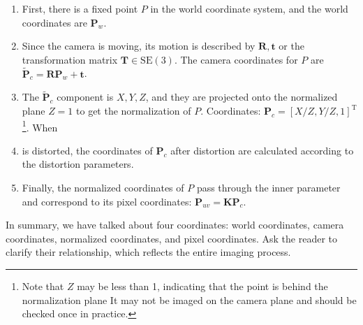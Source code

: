 \begin{enumerate}
	\item First, there is a fixed point $P$ in the world coordinate system, and the world coordinates are $\bm{P}_w$.
	\item Since the camera is moving, its motion is described by $\bm{R}, \bm{t}$ or the transformation matrix $\bm{T} \in \mathrm{SE}(3)$. The camera coordinates for $P$ are $\bm{\tilde{P}}_c = \bm{R} \bm{P}_w + \bm{t}$.
	\item The $\bm{\tilde{P}}_c$ component is $X,Y,Z$, and they are projected onto the normalized plane $Z=1$ to get the normalization of $P$. Coordinates: $\bm{P}_c = [X/Z, Y/Z, 1]^\mathrm{T}$\footnote{Note that $Z$ may be less than 1, indicating that the point is behind the normalization plane It may not be imaged on the camera plane and should be checked once in practice. }.
	When \item is distorted, the coordinates of $\bm{P}_c$ after distortion are calculated according to the distortion parameters.
	\item Finally, the normalized coordinates of $P$ pass through the inner parameter and correspond to its pixel coordinates: $\bm{P}_{uv} = \bm{K} \bm{P}_c$.
\end{enumerate}

In summary, we have talked about four coordinates: world coordinates, camera coordinates, normalized coordinates, and pixel coordinates. Ask the reader to clarify their relationship, which reflects the entire imaging process.
